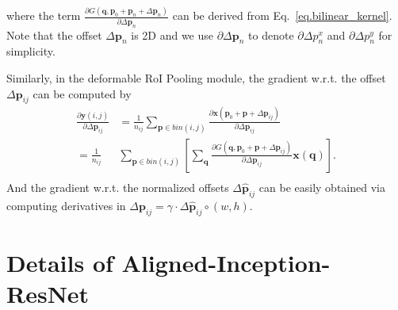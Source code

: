 \documentclass[10pt,twocolumn,letterpaper]{article}
\makeatletter
\newcommand{\tabincell}[2]{\begin{tabular}{@{}#1@{}}#2\end{tabular}}
\makeatother
\begin{document}
where the term $\frac{\partial  G(\mathbf{q}, \mathbf{p}_0+\mathbf{p}_n+\Delta \mathbf{p}_n)}{\partial \Delta \mathbf{p}_n} $ can be derived from Eq.~\eqref{eq.bilinear_kernel}. Note that the offset $\Delta \mathbf{p}_n$ is 2D and we use $\partial \Delta \mathbf{p}_n$ to denote $\partial\Delta p_n^x$ and $\partial\Delta p_n^y$ for simplicity.

Similarly, in the deformable RoI Pooling module, the gradient w.r.t. the offset $\Delta \mathbf{p}_{ij}$ can be computed by
\begin{equation}
\begin{split}
\frac{\partial \mathbf{y}(i,j)}{\partial \Delta \mathbf{p}_{ij}} & =\frac{1}{n_{ij}} \sum_{\mathbf{p}\in bin(i,j)} \frac{\partial \mathbf{x}(\mathbf{p}_0+\mathbf{p}+\Delta \mathbf{p}_{ij})}{\partial \Delta \mathbf{p}_{ij}} \\
=\frac{1}{n_{ij}} & \sum_{\mathbf{p}\in bin(i,j)} \left[ \sum_\mathbf{q}  \frac{\partial  G(\mathbf{q}, \mathbf{p}_0+\mathbf{p}+\Delta \mathbf{p}_{ij})}{\partial \Delta \mathbf{p}_{ij}} \mathbf{x}(\mathbf{q}) \right]. \\
\end{split}
\end{equation}
And the gradient w.r.t. the normalized offsets $ \Delta \widehat{\mathbf{p}}_{ij}$ can be easily obtained via computing derivatives in $\Delta \mathbf{p}_{ij} = \gamma \cdot \Delta \widehat{\mathbf{p}}_{ij} \circ (w, h)$.

\section{Details of Aligned-Inception-ResNet}
\label{sec:aligned_inception_resnet}

\newcommand{\blockb}[3]{\multirow{3}{*}{
\(\left[
\begin{array}{l}
\text{1$\times$1, #2}\\
[-.1em] \text{3$\times$3, #2}\\
[-.1em] \text{1$\times$1, #1}
\end{array}\right]\)$\times$#3}
}

\newcommand{\blockincres}[2]{\tabincell{c}{\multirow{3}{*}{
\(\left[
\begin{array}{c}
\text{#1-d}\\
[-.1em] \text{IRB}\\
\end{array}\right]\)$\times$#2}
}}
\end{document}
